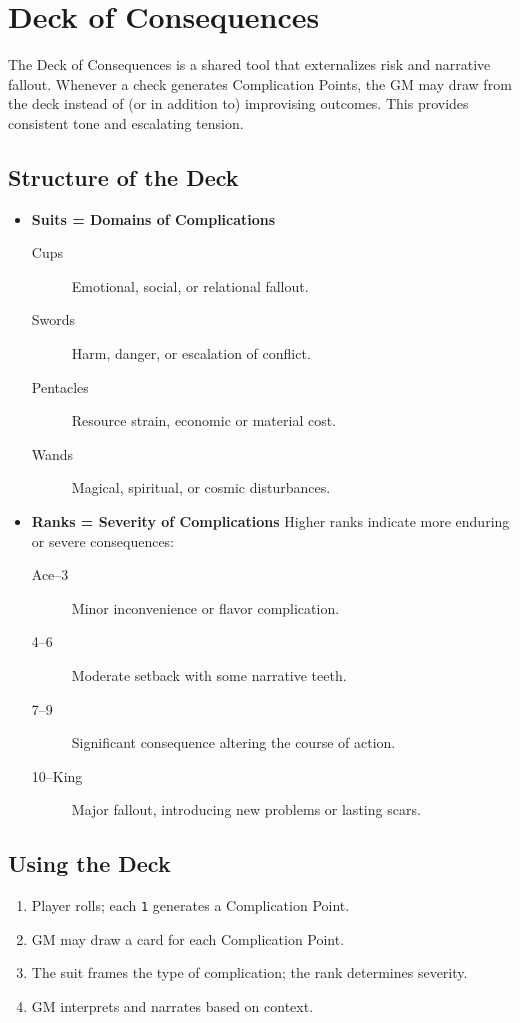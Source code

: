 \documentclass[12pt]{book}
\begin{document}
\chapter{Deck of Consequences}

The Deck of Consequences is a shared tool that externalizes risk and narrative fallout. 
Whenever a check generates Complication Points, the GM may draw from the deck instead of (or in addition to) improvising outcomes. 
This provides consistent tone and escalating tension.

\section{Structure of the Deck}
\begin{itemize}
  \item \textbf{Suits = Domains of Complications}
    \begin{description}
      \item[ Cups] Emotional, social, or relational fallout.
      \item[ Swords] Harm, danger, or escalation of conflict.
      \item[ Pentacles] Resource strain, economic or material cost.
      \item[ Wands] Magical, spiritual, or cosmic disturbances.
    \end{description}
  \item \textbf{Ranks = Severity of Complications}  
  Higher ranks indicate more enduring or severe consequences:
  \begin{description}
    \item[Ace–3] Minor inconvenience or flavor complication.
    \item[4–6] Moderate setback with some narrative teeth.
    \item[7–9] Significant consequence altering the course of action.
    \item[10–King] Major fallout, introducing new problems or lasting scars.
  \end{description}
\end{itemize}

\section{Using the Deck}
\begin{enumerate}
  \item Player rolls; each \texttt{1} generates a Complication Point.
  \item GM may draw a card for each Complication Point.
  \item The suit frames the type of complication; the rank determines severity.
  \item GM interprets and narrates based on context.
\end{enumerate}
\end{document}
